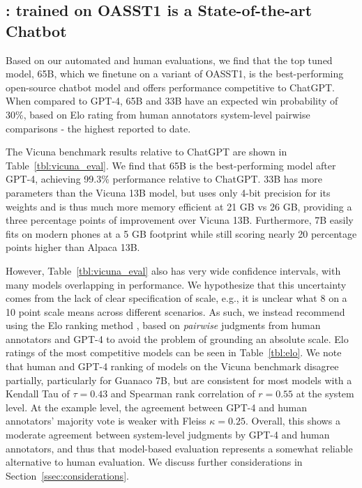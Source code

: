 \subsection{\bfmodel: \method trained on OASST1 is a State-of-the-art Chatbot} 
Based on our automated and human evaluations, we find that the top \method tuned model, \model 65B, which we finetune on a variant of OASST1, is the best-performing open-source chatbot model and offers performance competitive to ChatGPT. When compared to GPT-4, \model 65B and 33B have an expected win probability of 30\%, based on Elo rating from human annotators system-level pairwise comparisons - the highest reported to date.


The Vicuna benchmark \cite{vicuna2023} results relative to ChatGPT are shown in Table~\ref{tbl:vicuna_eval}. We find that \model 65B is the best-performing model after GPT-4, achieving 99.3\% performance relative to ChatGPT. \model 33B has more parameters than the Vicuna 13B model, but uses only 4-bit precision for its weights and is thus much more memory efficient at 21 GB vs 26 GB, providing a three percentage points of improvement over Vicuna 13B. Furthermore, \model 7B easily fits on modern phones at a 5 GB footprint while still scoring nearly 20 percentage points higher than Alpaca 13B. 


However, Table~\ref{tbl:vicuna_eval} also has very wide confidence intervals, with many models overlapping in performance. We hypothesize that this uncertainty comes from the lack of clear specification of scale, e.g., it is unclear what 8 on a 10 point scale means across different scenarios. As such, we instead recommend using the Elo ranking method \citep{elo1967proposed}, based on \textit{pairwise} judgments from human annotators and GPT-4 to avoid the problem of grounding an absolute scale.
Elo ratings of the most competitive models can be seen in Table~\ref{tbl:elo}. We note that human and GPT-4 ranking of models on the Vicuna benchmark disagree partially, particularly for Guanaco 7B, but are consistent for most models with a Kendall Tau of $\tau=0.43$ and Spearman rank correlation of $r=0.55$ at the system level. At the example level, the agreement between GPT-4 and human annotators' majority vote is weaker with Fleiss $\kappa=0.25$. Overall, this shows a moderate agreement between system-level judgments by GPT-4 and human annotators, and thus that model-based evaluation represents a somewhat reliable alternative to human evaluation. We discuss further considerations in Section~\ref{ssec:considerations}.

